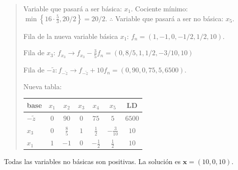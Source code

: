 \documentclass[12pt]{article}
\begin{document}
\small
\begin{quote}

Variable que pasará a ser básica: $x_1$. Cociente mínimo: $\min \left\{ 16 \cdot
\frac{5}{3}, 20 / 2\right\} = 20 / 2$. $\therefore $ Variable que pasará a ser
no básica: $x_5$. 

Fila de la nueva variable básica $x_1$: $ f_n = (1, -1, 0, - 1 / 2, 1 / 2, 10)$. 

Fila de $x_3$: $f_{x_3} \to f_{x_3} - \frac{3}{5} f_n = (0, 8 / 5, 1, 1 / 2, -3 /
10, 10)$

Fila de $-\widetilde{ z } : f_{-\widetilde{ z } } \to f_{-\widetilde{ z } } + 10
f_n = \left( 0, 90, 0, 75, 5,6500 \right) $.


Nueva tabla: 


\begin{table}[h]

\centering

\begin{tabular}{lccccc|c}

\toprule

base & $x_1$ & $x_2$ & $x_3$ & $x_4$ & $x_5$ &  LD \\

\midrule

$-\widetilde{ z } $  & $0$ & $90$ & $0$ & $75$ & $5$  & $6500$ \\
\midrule
$x_3$ & $0$ & $\frac{8}{5}$  & $1$ & $\frac{1}{2}$  & $-\frac{3}{10}$ & $10$ \\

$x_1$ & $1$ & $-1$  & $0$ & $-\frac{1}{2}$ & $\frac{1}{2}$ & $10$ \\

\bottomrule

\end{tabular}

\end{table}

\end{quote}
\normalsize

Todas las variables no básicas son positivas. La solución es $\textbf{x} = (10, 0,
10)$.

\pagebreak 
\end{document}
